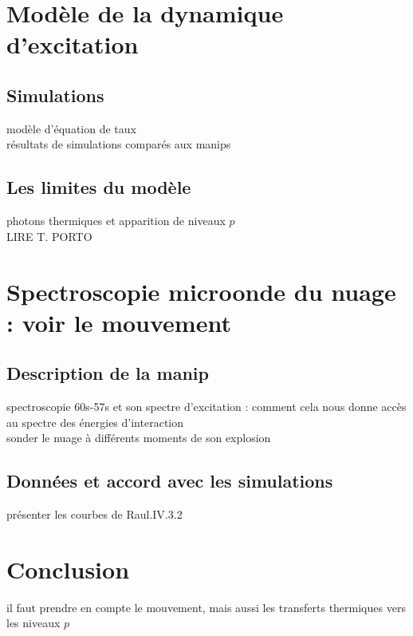 \section{Modèle de la dynamique d'excitation}
	\subsection{Simulations}
		\noindent modèle d'équation de taux\\
		\noindent résultats de simulations comparés aux manips\\
	\subsection{Les limites du modèle}
		\noindent photons thermiques et apparition de niveaux $p$ \\
		LIRE T. PORTO
		
\section{Spectroscopie microonde du nuage : voir le mouvement}
	\subsection{Description de la manip}
		\noindent spectroscopie 60s-57s et son spectre d'excitation : comment cela nous donne accès au spectre des énergies d'interaction\\
		sonder le nuage à différents moments de son explosion
	\subsection{Données et accord avec les simulations}
		\noindent présenter les courbes de Raul.IV.3.2
		

\section*{Conclusion}
		\noindent il faut prendre en compte le mouvement, mais aussi les transferts thermiques vers les niveaux $p$
		
